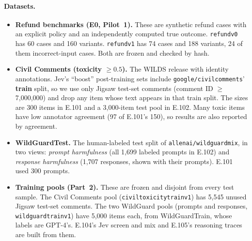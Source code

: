 \documentclass[11pt]{article}
\renewcommand{\_}{\origunderscore\allowbreak}
\begin{document}
\paragraph{Datasets.}
\begin{itemize}[leftmargin=*,itemsep=2pt]
  \item \textbf{Refund benchmarks (E0, Pilot~1).} These are synthetic refund cases with an explicit policy and an independently computed true outcome. \texttt{refund\_v0} has 60 cases and 160 variants. \texttt{refund\_v1} has 74 cases and 188 variants, 24 of them incorrect-input cases. Both are frozen and checked by hash.
  \item \textbf{Civil Comments (toxicity $\geq 0.5$).} The WILDS release with identity annotations. Jev's ``boost'' post-training sets include \texttt{google/civil\_comments}' \textbf{train} split, so we use only Jigsaw test-set comments (comment ID $\geq$ 7,000,000) and drop any item whose text appears in that train split. The sizes are 300 items in E.101 and a 3,000-item test pool in E.102. Many toxic items have low annotator agreement (97 of E.101's 150), so results are also reported by agreement.
  \item \textbf{WildGuardTest.} The human-labeled test split of \texttt{allenai/wildguardmix}, in two views: \emph{prompt harmfulness} (all 1,699 labeled prompts in E.102) and \emph{response harmfulness} (1,707 responses, shown with their prompts). E.101 used 300 prompts.
  \item \textbf{Training pools (Part~2).} These are frozen and disjoint from every test sample. The Civil Comments pool (\texttt{civil\_toxicity\_train\_v1}) has 5,545 unused Jigsaw test-set comments. The two WildGuard pools (prompts and responses, \texttt{wildguard\_*\_train\_v1}) have 5,000 items each, from WildGuardTrain, whose labels are GPT-4's. E.104's Jev screen and mix and E.105's reasoning traces are built from them.
\end{itemize}
\end{document}
